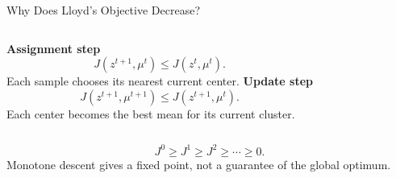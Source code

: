 \begin{frame}{Why Does Lloyd's Objective Decrease?}
  \begin{columns}[T,onlytextwidth]
      \textbf{Assignment step}
      \[
        J(z^{t+1},\mu^t)\le J(z^t,\mu^t).
      \]
      Each sample chooses its nearest current center.
      \textbf{Update step}
      \[
        J(z^{t+1},\mu^{t+1})\le J(z^{t+1},\mu^t).
      \]
      Each center becomes the best mean for its current cluster.
  \end{columns}
  \pause
  \vspace{.35cm}
  \[
    J^0\ge J^1\ge J^2\ge\cdots\ge0.
  \]
  \centering
  Monotone descent gives a fixed point, not a guarantee of the global optimum.
\end{frame}
